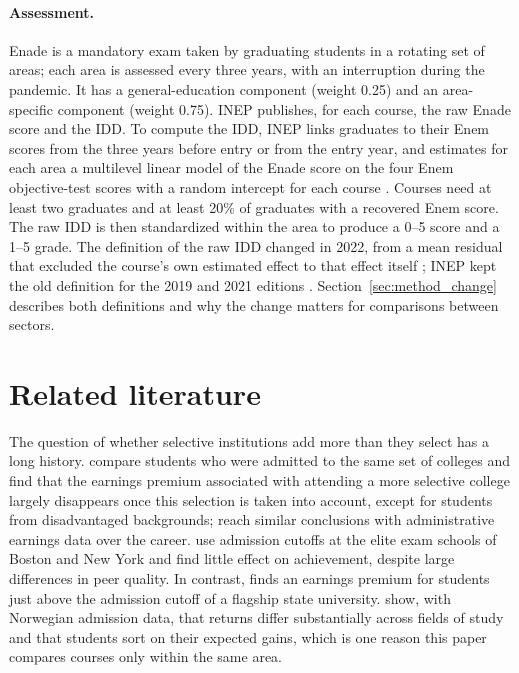 \documentclass[12pt,letterpaper]{article}
\begin{document}
\paragraph{Assessment.} Enade is a mandatory exam taken by graduating students in a rotating set of areas; each area is assessed every three years, with an interruption during the pandemic. It has a general-education component (weight 0.25) and an area-specific component (weight 0.75). INEP publishes, for each course, the raw Enade score and the IDD. To compute the IDD, INEP links graduates to their Enem scores from the three years before entry or from the entry year, and estimates for each area a multilevel linear model of the Enade score on the four Enem objective-test scores with a random intercept for each course \citep{inep2022idd,inep2023idd}. Courses need at least two graduates and at least 20\% of graduates with a recovered Enem score. The raw IDD is then standardized within the area to produce a 0--5 score and a 1--5 grade. The definition of the raw IDD changed in 2022, from a mean residual that excluded the course's own estimated effect to that effect itself \citep{inep2020idd,inep2022idd,inep2023idd,terhaar2021}; INEP kept the old definition for the 2019 and 2021 editions \citep{inep2024igc}. Section~\ref{sec:method_change} describes both definitions and why the change matters for comparisons between sectors.

\section{Related literature}\label{sec:literature}

The question of whether selective institutions add more than they select has a long history. \citet{dale2002} compare students who were admitted to the same set of colleges and find that the earnings premium associated with attending a more selective college largely disappears once this selection is taken into account, except for students from disadvantaged backgrounds; \citet{dale2014} reach similar conclusions with administrative earnings data over the career. \citet{abdulkadiroglu2014} use admission cutoffs at the elite exam schools of Boston and New York and find little effect on achievement, despite large differences in peer quality. In contrast, \citet{hoekstra2009} finds an earnings premium for students just above the admission cutoff of a flagship state university. \citet{kirkeboen2016} show, with Norwegian admission data, that returns differ substantially across fields of study and that students sort on their expected gains, which is one reason this paper compares courses only within the same area.
\end{document}
